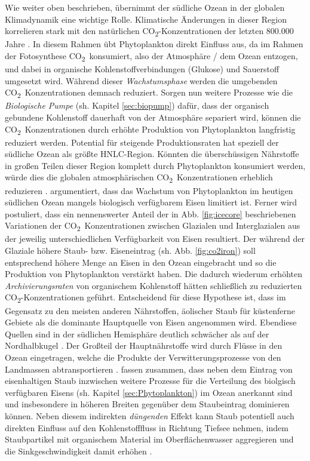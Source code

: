 \documentclass[12pt,a4paper,onecolumn,draft]{scrartcl}
\newcommand{\cotwo}{CO\textsubscript{2}}
\begin{document}
Wie weiter oben beschrieben, übernimmt der südliche Ozean in der globalen Klimadynamik eine wichtige Rolle. Klimatische Änderungen in dieser Region korrelieren stark mit den natürlichen \cotwo -Konzentrationen der letzten 800.000 Jahre \citep{Fischer.2010}. In diesem Rahmen übt Phytoplankton direkt Einfluss aus, da im Rahmen der Fotosynthese \cotwo \ konsumiert, also der Atmosphäre / dem Ozean entzogen, und dabei in organische Kohlenstoffverbindungen (Glukose) und Sauerstoff umgesetzt wird. Während dieser \textit{Wachstumsphase} werden die umgebenden \cotwo \ Konzentrationen demnach reduziert. Sorgen nun weitere Prozesse wie die \textit{Biologische Pumpe} (sh. Kapitel \ref{sec:biopump}) dafür, dass der organisch gebundene Kohlenstoff dauerhaft von der Atmosphäre separiert wird, können die \cotwo \ Konzentrationen durch erhöhte Produktion von Phytoplankton langfristig reduziert werden. Potential für steigende Produktionsraten hat speziell der südliche Ozean als größte HNLC-Region. Könnten die überschüssigen Nährstoffe in großen Teilen dieser Region komplett durch Phytoplankton konsumiert werden, würde dies die globalen atmosphärischen \cotwo \ Konzentrationen erheblich reduzieren \citep{Martin.1990}. \citet{Martin.1990} argumentiert, dass das Wachstum von Phytoplankton im heutigen südlichen Ozean mangels biologisch verfügbarem Eisen limitiert ist. Ferner wird postuliert, dass ein nennenswerter Anteil der in Abb. \ref{fig:icecore} beschriebenen Variationen der \cotwo \ Konzentrationen zwischen Glazialen und Interglazialen aus der jeweilig unterschiedlichen Verfügbarkeit von Eisen resultiert. Der während der Glaziale höhere Staub- bzw. Eiseneintrag (sh. Abb. \ref{fig:co2iron}) soll entsprechend höhere Menge an Eisen in den Ozean eingebracht und so die Produktion von Phytoplankton verstärkt haben. Die dadurch wiederum erhöhten \textit{Archivierungsraten} von organischem Kohlenstoff hätten schließlich zu reduzierten \cotwo-Konzentrationen geführt. Entscheidend für diese Hypothese ist, dass im Gegensatz zu den meisten anderen Nährstoffen, äolischer Staub für küstenferne Gebiete als die dominante Hauptquelle von Eisen angenommen wird. Ebendiese Quellen sind in der südlichen Hemisphäre deutlich schwächer als auf der Nordhalbkugel \citep{Shao.2011}. Der Großteil der Hauptnährstoffe wird durch Flüsse in den Ozean eingetragen, welche die Produkte der Verwitterungsprozesse von den Landmassen abtransportieren \citep{Emerson.2009}. \citet{Tagliabue.2017} fassen zusammen, dass neben dem Eintrag von eisenhaltigen Staub inzwischen weitere Prozesse für die Verteilung des biolgisch verfügbaren Eisens (sh. Kapitel \ref{sec:Phytoplankton}) im Ozean anerkannt sind und insbesondere in höheren Breiten gegenüber dem Staubeintrag dominieren können. Neben diesem indirekten \textit{düngenden} Effekt kann Staub potentiell auch direkten Einfluss auf den Kohlenstofffluss in Richtung Tiefsee nehmen, indem Staubpartikel mit organischem Material im Oberflächenwasser aggregieren und die Sinkgeschwindigkeit damit  erhöhen \citep{vanderJagt.2018} . \\
\end{document}
